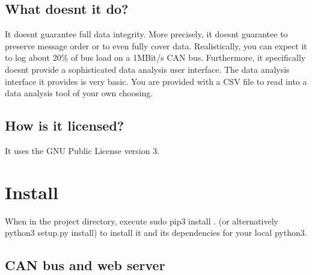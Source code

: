 \subsection*{What doesn\textquotesingle{}t it do? }

It doesn\textquotesingle{}t guarantee full data integrity. More precisely, it doesn\textquotesingle{}t guarantee to preserve message order or to even fully cover data. Realistically, you can expect it to log about 20\% of bus load on a 1\+M\+Bit/s C\+AN bus. Furthermore, it specifically doesn\textquotesingle{}t provide a sophisticated data analysis user interface. The data analysis interface it provides is very basic. You are provided with a C\+SV file to read into a data analysis tool of your own choosing.

\subsection*{How is it licensed? }

It uses the G\+NU Public License version 3.

\section*{Install }

When in the project directory, execute {\ttfamily sudo pip3 install .} (or alternatively {\ttfamily python3 setup.\+py install}) to install it and its dependencies for your local {\ttfamily python3}.

\subsection*{C\+AN bus and web server }

